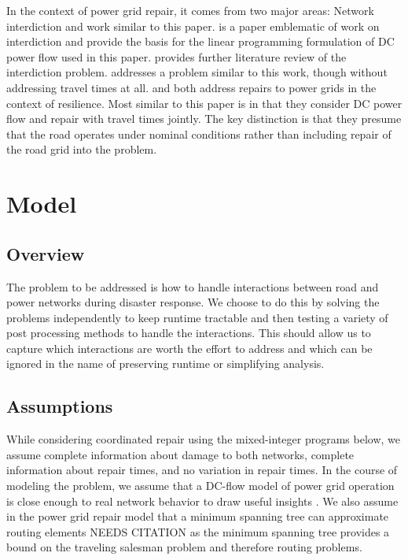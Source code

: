 \documentclass[10pt]{article}
\begin{document}
In the context of power grid repair, it comes from two major areas: Network interdiction and work similar to this paper. \cite{SalmeronEA2010} is a paper emblematic of work on interdiction and provide the basis for the linear programming formulation of DC power flow used in this paper. \cite{Wood2011} provides further literature review of the interdiction problem. \cite{NPSMasters} addresses a problem similar to this work, though without addressing travel times at all. \cite{ArabEA2015} and \cite{MousavizadehEA2018} both address repairs to power grids in the context of resilience. Most similar to this paper is \cite{BentEA2011} in that they consider DC power flow and repair with travel times jointly. The key distinction is that they presume that the road operates under nominal conditions rather than including repair of the road grid into the problem.

\section{\large{Model}}
\vspace*{-12pt}
\subsection{Overview}
The problem to be addressed is how to handle interactions between road and power networks during disaster response. We choose to do this by solving the problems independently to keep runtime tractable and then testing a variety of post processing methods to handle the interactions. This should allow us to capture which interactions are worth the effort to address and which can be ignored in the name of preserving runtime or simplifying analysis. 
\subsection{Assumptions}
\vspace*{-12pt}
While considering coordinated repair using the mixed-integer programs below, we assume complete information about damage to both networks, complete information about repair times, and no variation in repair times. In the course of modeling the problem, we assume that a DC-flow model of power grid operation is close enough to real network behavior to draw useful insights \cite{QiEA2012}. We also assume in the power grid repair model that a minimum spanning tree can approximate routing elements NEEDS CITATION as the minimum spanning tree provides a bound on the traveling salesman problem and therefore routing problems.
\end{document}
